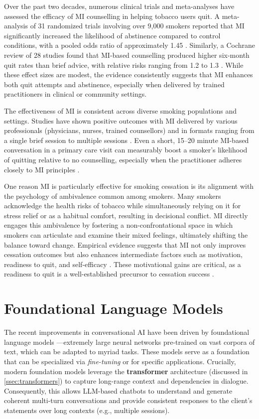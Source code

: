 Over the past two decades, numerous clinical trials and meta-analyses have assessed the
efficacy of MI counselling in helping tobacco users quit. A meta-analysis of 31
randomized trials involving over 9,000 smokers reported that MI significantly increased
the likelihood of abstinence compared to control conditions, with a pooled odds ratio
of approximately 1.45 \cite{Heckman2010}. Similarly, a Cochrane review of 28 studies
found that MI-based counselling produced higher six-month quit rates than brief advice,
with relative risks ranging from 1.2 to 1.3 \cite{Lindson2015}. While these effect
sizes are modest, the evidence consistently suggests that MI enhances both quit
attempts and abstinence, especially when delivered by trained practitioners in clinical
or community settings.

The effectiveness of MI is consistent across diverse smoking populations and settings.
Studies have shown positive outcomes with MI delivered by various professionals
(physicians, nurses, trained counsellors) and in formats ranging from a single brief
session to multiple sessions \cite{Lindson2015}. Even a short, 15–20 minute MI-based
conversation in a primary care visit can measurably boost a smoker's likelihood of
quitting relative to no counselling, especially when the practitioner adheres closely
to MI principles \cite{zanjani2008effectiveness}.

One reason MI is particularly effective for smoking cessation is its alignment with the
psychology of ambivalence common among smokers. Many smokers acknowledge the health
risks of tobacco while simultaneously relying on it for stress relief or as a habitual
comfort, resulting in decisional conflict. MI directly engages this ambivalence by
fostering a non-confrontational space in which smokers can articulate and examine their
mixed feelings, ultimately shifting the balance toward change. Empirical evidence
suggests that MI not only improves cessation outcomes but also enhances intermediate
factors such as motivation, readiness to quit, and self-efficacy \cite{Boudreaux2012,
	Hettema2005}. These motivational gains are critical, as a readiness to quit is a
well-established precursor to cessation success \cite{West2006}.

\section{Foundational Language Models} \label{sec:foundational_models}
The recent improvements in conversational AI have been driven by foundational language
models \cite{stanfordCRFM2021}---extremely large neural networks pre-trained on vast
corpora of text, which can be adapted to myriad tasks. These models serve as a
foundation that can be specialized via \emph{fine-tuning} or for specific applications.
Crucially, modern foundation models leverage the \textbf{transformer} architecture
(discussed in \cref{ssec:transformers}) to capture long-range context and dependencies
in dialogue. Consequently, this allows LLM-based chatbots to understand and generate
coherent multi-turn conversations and provide consistent responses to the client's
statements over long contexts (e.g., multiple sessions).

